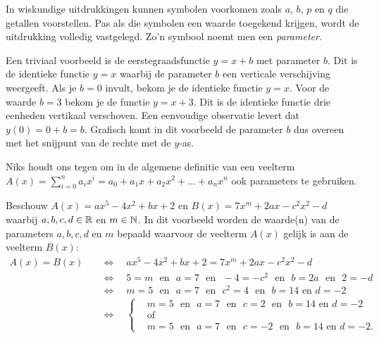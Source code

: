\documentclass{ximera}
\begin{document}
	\author{Koen de Naeghel - Wiskunde Op Maat}
    \xmsource



In wiskundige uitdrukkingen kunnen symbolen voorkomen zoals $a$, $b$, $p$ en $q$ die getallen voorstellen. Pas als die symbolen een waarde toegekend krijgen, wordt de uitdrukking volledig vastgelegd. Zo'n symbool noemt men een \textit{ parameter}. 

Een triviaal voorbeeld is de eerstegraadsfunctie \(y = x + b\) met parameter \(b\). Dit is de identieke functie \(y = x\) waarbij de parameter \(b\) een verticale verschijving weergeeft. Als je \(b = 0\) invult, bekom je de identieke functie \(y = x\). Voor de waarde \(b =3\) bekom je de functie \(y = x+3\). Dit is de identieke functie drie eenheden vertikaal verschoven. Een eenvoudige observatie levert dat \(y(0) = 0 + b = b\). Grafisch komt in dit voorbeeld de parameter \(b\) dus overeen met het snijpunt van de rechte met de \(y\)-as. 

Niks houdt ons tegen om in de algemene definitie van een veelterm \(A(x) = \sum_{i=0}^n a_i x^i = a_0 + a_1x + a_2x^2 + \dots + a_n x^n\) ook parameters te gebruiken. 

\begin{example} 
Beschouw $A(x) = ax^5 - 4x^2 + bx + 2$ en $B(x) = 7x^m + 2ax - c^2x^2 - d$ waarbij $a,b,c,d \in \mathbb{R}$ en $m \in \mathbb{N}$. In dit voorbeeld worden de waarde(n) van de parameters $a,b,c,d$ en $m$ bepaald waarvoor de veelterm $A(x)$ gelijk is aan de veelterm $B(x)$: 
\begin{align*}
A(x) = B(x) \quad 
& \Leftrightarrow \quad ax^5 - 4x^2 + bx + 2 = 7x^m + 2ax - c^2x^2 - d \\
& \Leftrightarrow \quad 5 = m \,\,\text{ en }\,\, a = 7 \,\,\text{ en }\,\, -4 = -c^2 \,\,\text{ en }\,\, b = 2a \,\,\text{ en }\,\, 2 = -d \\
& \Leftrightarrow \quad m=5 \,\,\text{ en }\,\, a = 7 \,\,\text{ en }\,\, c^2 = 4 \,\,\text{ en }\,\, b = 14 \text{ en } d = -2 \\
& \Leftrightarrow \quad 
\left\{
\begin{aligned}
& m=5 \,\,\text{ en }\,\, a = 7 \,\,\text{ en }\,\, c = 2 \,\,\text{ en }\,\, b = 14 \text{ en } d = -2 \\
& \text{of} \\
& m=5 \,\,\text{ en }\,\, a = 7 \,\,\text{ en }\,\, c = -2 \,\,\text{ en }\,\, b = 14 \text{ en } d = -2.
\end{aligned}
\right.
\end{align*}
\end{example} 
\end{document}
